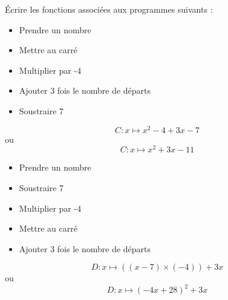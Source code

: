 \begin{frame}
    Écrire les fonctions associées aux programmes suivants :
    \vspace*{1em}

    \begin{minipage}[t]{0.45\textwidth}
        \begin{itemize}
            \item Prendre un nombre 
            \item Mettre au carré
            \item Multiplier par -4
            \item Ajouter 3 fois le nombre de départs
            \item Soustraire 7
        \end{itemize}
        \begin{center}
            $$C:x\mapsto x^2-4+3x-7$$ ou $$C:x\mapsto x^2+3x-11$$
        \end{center}
    \end{minipage}
    \hfil
    \vrule
    \hfil
    \begin{minipage}[t]{0.45\textwidth}
        \begin{itemize}
            \item Prendre un nombre 
            \item Soustraire 7
            \item Multiplier par -4
            \item Mettre au carré
            \item Ajouter 3 fois le nombre de départs
        \end{itemize}
        \begin{center}
            $$D:x\mapsto ((x-7)\times (-4))+3x$$ ou
            $$D:x\mapsto (-4x+28)^2+3x$$
        \end{center}
    \end{minipage}
\end{frame}